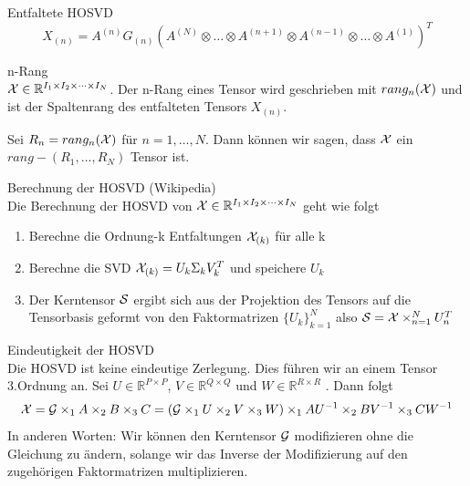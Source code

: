 \begin{Bemerkung} Entfaltete HOSVD \\
\begin{equation}
X_{(n)} = A^{(n)} G_{(n)} ( A^{(N)} \otimes \dots \otimes A^{(n+1)} \otimes A^{(n-1)} \otimes \dots \otimes A^{(1)} )^{T}
\end{equation}
\end{Bemerkung}

\begin{Definition} n-Rang \\
 ${\cal X}  \in \mathbb{R}^{I_1 \times I_2 \times \dots \times I_N}$. Der n-Rang eines Tensor wird geschrieben mit $rang_n({\cal X})$ und ist der Spaltenrang des entfalteten Tensors $X_{(n)}$.
\end{Definition}

\begin{Bemerkung}
Sei $R_n = rang_n({\cal X})$ für $n=1, \dots, N$. Dann können wir sagen, dass ${\cal X}$ ein $rang-(R_1,\dots,R_N)$ Tensor ist.
\end{Bemerkung}

\begin{Bemerkung} Berechnung der HOSVD (Wikipedia) \\
Die Berechnung der HOSVD von ${\cal X}  \in \mathbb{R}^{I_1 \times I_2 \times \dots \times I_N}$ geht wie folgt
\begin{enumerate}
\item Berechne die Ordnung-k Entfaltungen ${\cal X}_{(k)}$ für alle k
\item Berechne die SVD ${\cal X}_{(k)}=U_k \Sigma_k V_k^T$ und speichere $U_k$
\item Der Kerntensor ${\cal S}$ ergibt sich aus der Projektion des Tensors auf die Tensorbasis geformt von den Faktormatrizen  $\{ U_k\}_{k=1}^{N}$  also ${\cal S}={\cal X} \times_{n=1}^{N} U_n^T$
\end{enumerate}
\end{Bemerkung}

\begin{Bemerkung} Eindeutigkeit der HOSVD \\
Die HOSVD ist keine eindeutige Zerlegung. Dies führen wir an einem Tensor 3.Ordnung an. Sei $U \in \mathbb{R}^{P \times P}$, $V \in \mathbb{R}^{Q \times Q}$  und $W \in \mathbb{R}^{R \times R}$ . Dann folgt
\begin{equation}
{\cal X} = {\cal G} \times_1 A \times_2 B \times_3 C = ({\cal G} \times_1 U \times_2 V \times_3 W) \times_1 AU^{-1} \times_2 BV^{-1} \times_3 CW^{-1}
\end{equation}
In anderen Worten: Wir können den Kerntensor ${\cal G}$ modifizieren ohne die Gleichung zu ändern, solange wir das Inverse der Modifizierung auf den zugehörigen Faktormatrizen multiplizieren.
\end{Bemerkung}

